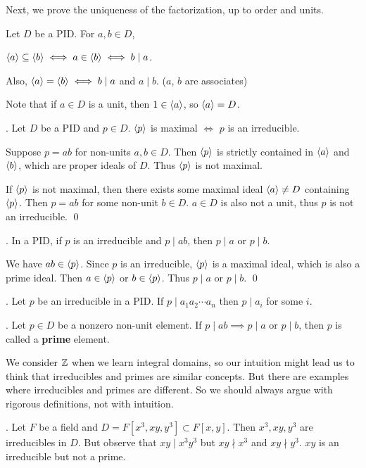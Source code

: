 Next, we prove the uniqueness of the factorization, up to order and units.

\rmk Let \(D\) be a PID. For \(a, b \in D\),
\begin{center}
    \(\left\langle a \right\rangle \subseteq \left\langle b \right\rangle \iff a \in \left\langle b \right\rangle \iff b \mid a\).
\end{center}
Also, \(\left\langle a \right\rangle = \left\langle b \right\rangle \iff b \mid a\) and \(a \mid b\). (\(a\), \(b\) are associates)

Note that if \(a \in D\) is a unit, then \(1 \in \left\langle a \right\rangle\), so \(\left\langle a \right\rangle = D\).

\lemma. Let \(D\) be a PID and \(p \in D\). \(\left\langle p \right\rangle\) is maximal \(\iff\) \(p\) is an irreducible.

\pf \note{\mimp} Suppose \(p = ab\) for non-units \(a, b \in D\). Then \(\left\langle p \right\rangle\) is strictly contained in \(\left\langle a \right\rangle\) and \(\left\langle b \right\rangle\), which are proper ideals of \(D\). Thus \(\left\langle p \right\rangle\) is not maximal.

\note{\mimpd} If \(\left\langle p \right\rangle\) is not maximal, then there exists some maximal ideal \(\left\langle a \right\rangle \neq D\) containing \(\left\langle p \right\rangle\). Then \(p = ab\) for some non-unit \(b \in D\). \(a \in D\) is also not a unit, thus \(p\) is not an irreducible. \qed

\lemma. In a PID, if \(p\) is an irreducible and \(p \mid ab\), then \(p \mid a\) or \(p \mid b\).

\pf We have \(ab \in \left\langle p \right\rangle\). Since \(p\) is an irreducible, \(\left\langle p \right\rangle\) is a maximal ideal, which is also a prime ideal. Then \(a \in \left\langle p \right\rangle\) or \(b \in \left\langle p \right\rangle\). Thus \(p \mid a\) or \(p \mid b\). \qed

\cor. Let \(p\) be an irreducible in a PID. If \(p \mid a_1a_2\cdots a_n\) then \(p \mid a_i\) for some \(i\).

.  Let \(p \in D\) be a nonzero non-unit element. If \(p \mid ab \implies p \mid a\) or \(p \mid b\), then \(p\) is called a \textbf{prime} element.

We consider \(\mathbb{Z}\) when we learn integral domains, so our intuition might lead us to think that irreducibles and primes are similar concepts. But there are examples where irreducibles and primes are different. So we should always argue with rigorous definitions, not with intuition.

\ex. Let \(F\) be a field and \(D = F[x^3, xy, y^3] \subset F[x, y]\). Then \(x^3, xy, y^3\) are irreducibles in \(D\). But observe that \(xy \mid x^3y^3\) but \(xy \nmid x^3\) and \(xy \nmid y^3\). \(xy\) is an irreducible but not a prime.

